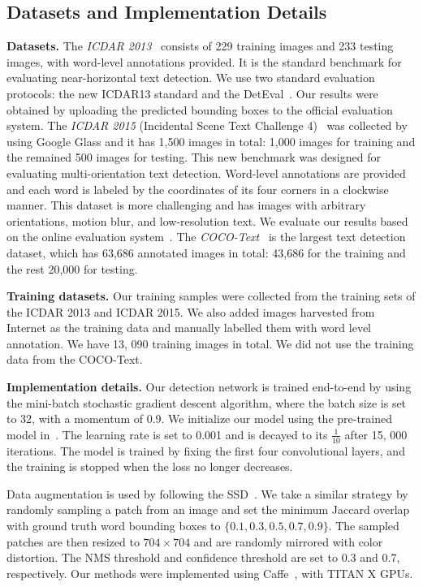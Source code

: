 \documentclass[10pt,twocolumn,letterpaper]{article}
\begin{document}
\subsection{Datasets and Implementation Details}
\textbf{Datasets.} The\textit{ ICDAR 2013}~\cite{Karatzas2013} consists of 229 training images and 233 testing
images, with word-level annotations provided. It is the standard benchmark for evaluating near-horizontal text detection. We use two standard evaluation protocols: the new ICDAR13 standard \cite{Karatzas2015} and the DetEval~\cite{Karatzas2013}. Our results were obtained by uploading the predicted bounding boxes to the official evaluation system. The \textit{ICDAR 2015} (Incidental Scene Text Challenge 4)~\cite{Karatzas2015} was collected by using Google Glass and it has 1,500 images in total: 1,000 images for training and the remained 500 images for testing. This new benchmark was designed for evaluating multi-orientation text detection. Word-level annotations are provided and each word is labeled by the coordinates of its four corners in a clockwise manner. This dataset is more challenging and has images with arbitrary orientations, motion blur, and low-resolution text. We evaluate our results based on the online evaluation system~\cite{Karatzas2015}. The \textit{COCO-Text}~\cite{veit2016cocotext} is the largest text detection dataset, which has 63,686 annotated images in total: 43,686 for the training and the rest 20,000 for testing.

\textbf{Training datasets.} Our training samples were collected from the training sets of the ICDAR 2013 and ICDAR 2015. We also added images harvested from Internet as the training data and manually labelled them with word level annotation. We have 13, 090 training images in total. We did not use the training data from the COCO-Text.

\textbf{Implementation details.} Our detection network is trained end-to-end by using the mini-batch stochastic gradient descent algorithm, where the batch size is set to 32, with a momentum of 0.9. We initialize our model using the pre-trained model in~\cite{liu2016SSD}. The learning rate is set to 0.001 and is decayed to its $\frac{1}{10}$ after 15, 000 iterations. The model is
trained by fixing the first four convolutional layers, and the training is stopped when the loss no longer decreases.

Data augmentation is used by following the SSD~\cite{liu2016SSD}. We take a similar strategy by randomly sampling a patch from an image and set the minimum Jaccard overlap with ground truth word bounding boxes to $\{0.1, 0.3, 0.5, 0.7, 0.9\}$.
The sampled patches are then resized to $704 \times 704$ and are randomly mirrored with color distortion. 
The NMS threshold and confidence threshold are set to 0.3 and 0.7, respectively. Our methods were implemented using Caffe~\cite{Jia2014}, with  TITAN X GPUs.
\end{document}
